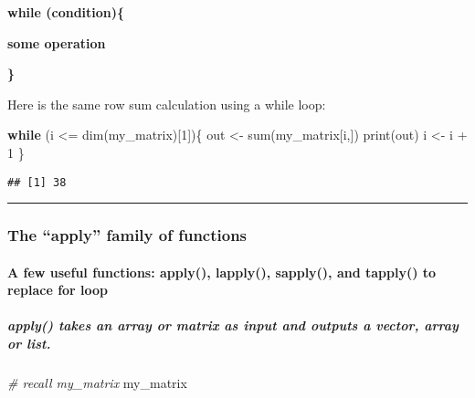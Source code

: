 \documentclass[
]{article}
\newenvironment{Shaded}{\begin{snugshade}}{\end{snugshade}}
\newcommand{\CommentTok}[1]{\textcolor[rgb]{0.56,0.35,0.01}{\textit{#1}}}
\newcommand{\ControlFlowTok}[1]{\textcolor[rgb]{0.13,0.29,0.53}{\textbf{#1}}}
\newcommand{\DecValTok}[1]{\textcolor[rgb]{0.00,0.00,0.81}{#1}}
\newcommand{\FunctionTok}[1]{\textcolor[rgb]{0.00,0.00,0.00}{#1}}
\newcommand{\NormalTok}[1]{#1}
\newcommand{\OtherTok}[1]{\textcolor[rgb]{0.56,0.35,0.01}{#1}}
\newcommand{\SpecialCharTok}[1]{\textcolor[rgb]{0.00,0.00,0.00}{#1}}
\begin{document}
\textbf{while (condition)\{}

\textbf{some operation}

\textbf{\}}

Here is the same row sum calculation using a while loop:

\begin{Shaded}
\begin{Highlighting}[]
\ControlFlowTok{while}\NormalTok{ (i }\SpecialCharTok{\textless{}=} \FunctionTok{dim}\NormalTok{(my\_matrix)[}\DecValTok{1}\NormalTok{])\{}
\NormalTok{  out }\OtherTok{\textless{}{-}} \FunctionTok{sum}\NormalTok{(my\_matrix[i,])}
  \FunctionTok{print}\NormalTok{(out)}
\NormalTok{  i }\OtherTok{\textless{}{-}}\NormalTok{ i }\SpecialCharTok{+} \DecValTok{1}
\NormalTok{\}}
\end{Highlighting}
\end{Shaded}

\begin{verbatim}
## [1] 38
\end{verbatim}

\begin{center}\rule{0.5\linewidth}{0.5pt}\end{center}

\hypertarget{the-apply-family-of-functions}{%
\subsubsection{The ``apply'' family of
functions}\label{the-apply-family-of-functions}}

\hypertarget{a-few-useful-functions-apply-lapply-sapply-and-tapply-to-replace-for-loop}{%
\paragraph{A few useful functions: apply(), lapply(), sapply(), and
tapply() to replace for
loop}\label{a-few-useful-functions-apply-lapply-sapply-and-tapply-to-replace-for-loop}}

\hypertarget{apply-takes-an-array-or-matrix-as-input-and-outputs-a-vector-array-or-list.}{%
\subparagraph{apply() takes an array or matrix as input and outputs a
vector, array or
list.}\label{apply-takes-an-array-or-matrix-as-input-and-outputs-a-vector-array-or-list.}}

\begin{Shaded}
\begin{Highlighting}[]
\CommentTok{\# recall my\_matrix}
\NormalTok{my\_matrix}
\end{Highlighting}
\end{Shaded}
\end{document}
